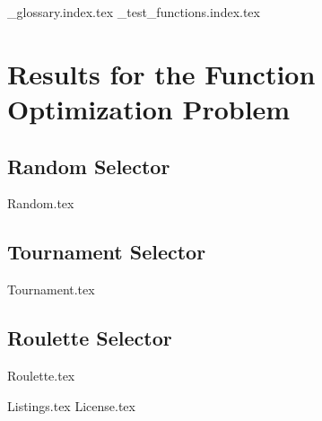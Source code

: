 \appendix
{_glossary.index.tex}
{_test_functions.index.tex}
\section{Results for the Function Optimization Problem}
\label{app:fn_opt:results}

    \subsection{Random Selector}
        {Random.tex}
    \subsection{Tournament Selector}
        {Tournament.tex}
    \subsection{Roulette Selector}
        {Roulette.tex}

{Listings.tex}
{License.tex}
